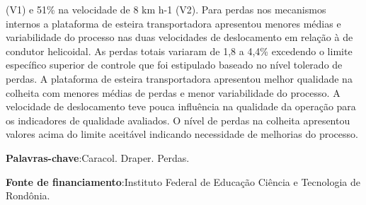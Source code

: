 \documentclass[article,12pt,onesidea,4paper,english,brazil]{abntex2}
\begin{document}
	(V1) e 51\% na velocidade de 8 km h-1 (V2). Para perdas nos
	mecanismos internos a plataforma de esteira transportadora apresentou menores
	médias e variabilidade do processo nas duas velocidades de deslocamento em
	relação à de condutor helicoidal. As perdas totais variaram de 1,8 a 4,4\% excedendo
	o limite específico superior de controle que foi estipulado baseado no nível tolerado
	de perdas. A plataforma de esteira transportadora apresentou melhor qualidade na
	colheita com menores médias de perdas e menor variabilidade do processo. A
	velocidade de deslocamento teve pouca influência na qualidade da operação para
	os indicadores de qualidade avaliados. O nível de perdas na colheita apresentou
	valores acima do limite aceitável indicando necessidade de melhorias do processo.
	
	\vspace{\onelineskip}
	
	\noindent
	\textbf{Palavras-chave}:Caracol. Draper. Perdas.
	
	\noindent
	\textbf{Fonte de financiamento}:Instituto Federal de Educação Ciência e Tecnologia de
	Rondônia.
	
\end{document}
